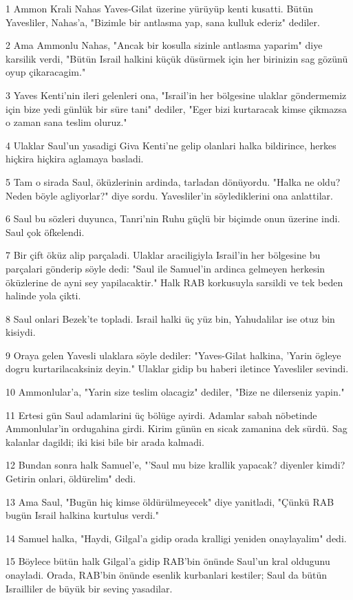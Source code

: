 \par 1 Ammon Krali Nahas Yaves-Gilat üzerine yürüyüp kenti kusatti. Bütün Yavesliler, Nahas'a, "Bizimle bir antlasma yap, sana kulluk ederiz" dediler.
\par 2 Ama Ammonlu Nahas, "Ancak bir kosulla sizinle antlasma yaparim" diye karsilik verdi, "Bütün Israil halkini küçük düsürmek için her birinizin sag gözünü oyup çikaracagim."
\par 3 Yaves Kenti'nin ileri gelenleri ona, "Israil'in her bölgesine ulaklar göndermemiz için bize yedi günlük bir süre tani" dediler, "Eger bizi kurtaracak kimse çikmazsa o zaman sana teslim oluruz."
\par 4 Ulaklar Saul'un yasadigi Giva Kenti'ne gelip olanlari halka bildirince, herkes hiçkira hiçkira aglamaya basladi.
\par 5 Tam o sirada Saul, öküzlerinin ardinda, tarladan dönüyordu. "Halka ne oldu? Neden böyle agliyorlar?" diye sordu. Yavesliler'in söylediklerini ona anlattilar.
\par 6 Saul bu sözleri duyunca, Tanri'nin Ruhu güçlü bir biçimde onun üzerine indi. Saul çok öfkelendi.
\par 7 Bir çift öküz alip parçaladi. Ulaklar araciligiyla Israil'in her bölgesine bu parçalari gönderip söyle dedi: "Saul ile Samuel'in ardinca gelmeyen herkesin öküzlerine de ayni sey yapilacaktir." Halk RAB korkusuyla sarsildi ve tek beden halinde yola çikti.
\par 8 Saul onlari Bezek'te topladi. Israil halki üç yüz bin, Yahudalilar ise otuz bin kisiydi.
\par 9 Oraya gelen Yavesli ulaklara söyle dediler: "Yaves-Gilat halkina, 'Yarin ögleye dogru kurtarilacaksiniz deyin." Ulaklar gidip bu haberi iletince Yavesliler sevindi.
\par 10 Ammonlular'a, "Yarin size teslim olacagiz" dediler, "Bize ne dilerseniz yapin."
\par 11 Ertesi gün Saul adamlarini üç bölüge ayirdi. Adamlar sabah nöbetinde Ammonlular'in ordugahina girdi. Kirim günün en sicak zamanina dek sürdü. Sag kalanlar dagildi; iki kisi bile bir arada kalmadi.
\par 12 Bundan sonra halk Samuel'e, "'Saul mu bize krallik yapacak? diyenler kimdi? Getirin onlari, öldürelim" dedi.
\par 13 Ama Saul, "Bugün hiç kimse öldürülmeyecek" diye yanitladi, "Çünkü RAB bugün Israil halkina kurtulus verdi."
\par 14 Samuel halka, "Haydi, Gilgal'a gidip orada kralligi yeniden onaylayalim" dedi.
\par 15 Böylece bütün halk Gilgal'a gidip RAB'bin önünde Saul'un kral oldugunu onayladi. Orada, RAB'bin önünde esenlik kurbanlari kestiler; Saul da bütün Israilliler de büyük bir sevinç yasadilar.


